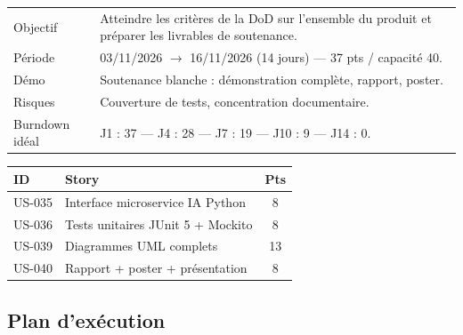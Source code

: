 \begin{center}
\begin{tabular}{lp{11cm}}
\toprule
Objectif  & Atteindre les critères de la DoD sur l'ensemble du produit et
            préparer les livrables de soutenance. \\
Période   & 03/11/2026 $\rightarrow$ 16/11/2026 (14 jours) --- 37 pts / capacité 40. \\
Démo      & Soutenance blanche : démonstration complète, rapport, poster. \\
Risques   & Couverture de tests, concentration documentaire. \\
Burndown idéal & J1 : 37 --- J4 : 28 --- J7 : 19 --- J10 : 9 --- J14 : 0. \\
\bottomrule
\end{tabular}
\end{center}

\begin{center}
\begin{tabular}{lp{9cm}c}
\toprule
\textbf{ID} & \textbf{Story} & \textbf{Pts} \\
\midrule
US-035 & Interface microservice IA Python    & 8 \\
US-036 & Tests unitaires JUnit 5 + Mockito   & 8 \\
US-039 & Diagrammes UML complets             & 13 \\
US-040 & Rapport + poster + présentation     & 8 \\
\bottomrule
\end{tabular}
\end{center}

\subsection{Plan d'exécution}

